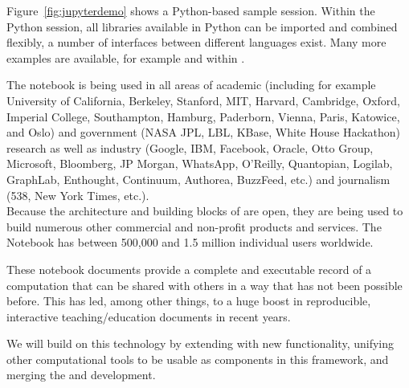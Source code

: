 Figure~\ref{fig:jupyterdemo} shows a Python-based sample
session. Within the Python session, all libraries available in Python
can be imported and combined flexibly, a number of interfaces between
different languages exist. Many more examples are available, for
example \cite{IPython-demo-hyperbolic-conservation-laws} and
within \cite{IPython-sload-foundation-report-2013}.

The \Jupyter notebook is being used in all areas of academic
(including for example University of California, Berkeley, Stanford,
MIT, Harvard, Cambridge, Oxford, Imperial College, Southampton,
Hamburg, Paderborn, Vienna, Paris, Katowice, and Oslo) and government
(NASA JPL, LBL, KBase, White House Hackathon) research as well as
industry (Google, IBM, Facebook, Oracle, Otto Group, Microsoft,
Bloomberg, JP Morgan, WhatsApp, O’Reilly, Quantopian, Logilab,
GraphLab, Enthought, Continuum, Authorea, BuzzFeed, etc.)  and
journalism (538, New York Times, etc.). \\
%
Because the architecture and building blocks of \Jupyter are open,
they are being used to build numerous other commercial and non-profit
products and services. The \Jupyter Notebook has between 500,000 and
1.5 million individual users worldwide.

These notebook documents provide a complete and executable record of a
computation that can be shared with others in a way that has not been
possible before. This has led, among other things, to a huge boost in
reproducible, interactive teaching/education documents in recent
years.

We will build on this technology by extending \Jupyter with new
functionality, unifying other computational tools to be usable as
components in this framework, and merging the \Sage and \Jupyter
development.



